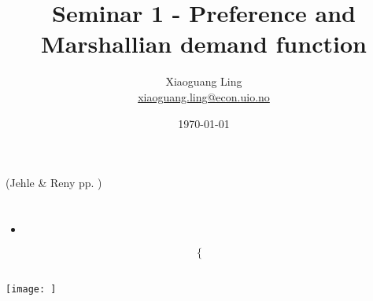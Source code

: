 \documentclass{article}
\title{Seminar 1 - Preference and Marshallian demand function}
\author{Xiaoguang Ling \\  \href{xiaoguang.ling@econ.uio.no}{xiaoguang.ling@econ.uio.no}}
\date{\today}
\begin{document}
\maketitle

(Jehle \& Reny pp. )
\section{}

\begin{mdframed}[backgroundcolor=blue!20,linecolor=white]

\end{mdframed}


\begin{mdframed}[backgroundcolor=yellow!20,linecolor=white]

\end{mdframed}




\begin{itemize}
\item 
\end{itemize}


\begin{equation}
    \begin{cases}

    \end{cases}
    \label{eq:}   
\end{equation}


\begin{aligns}


\end{aligns}





\subsection{}

{\centering
\texttt{[image: ]}
\label{}}
\vspace{2mm}
\end{document}
